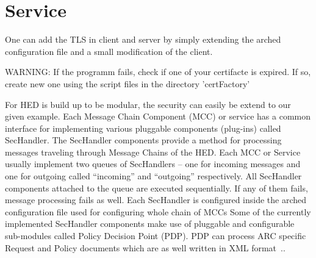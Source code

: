 %
%


\clearpage
\section{Service}

One can add the TLS in client and server by simply extending the arched configuration file and a small modification of the client.



WARNING: If the programm fails, check if one of your certifacte is expired. If so, create new one using the script files in the directory 'certFactory'

For HED is build up to  %
be modular, the security can easily be extend to our given example.
Each Message Chain Component (MCC) or service has a common interface for implementing various pluggable components (plug-ins) called SecHandler. The SecHandler components provide a method for processing messages traveling through Message Chains of the HED. 
Each MCC or Service usually implement two queues of SecHandlers – one for incoming messages and one for outgoing called “incoming” and “outgoing” respectively. All SecHandler components attached to the queue are executed sequentially. 
If any of them fails, message processing fails as well. 
Each SecHandler is configured inside the arched configuration file used for configuring whole chain of MCCs 
Some of the currently implemented SecHandler components make use of pluggable and configurable sub-modules called Policy Decision Point (PDP). PDP can process ARC specific Request and Policy documents which are as well written in XML format~\cite{QIANG_2008}..




